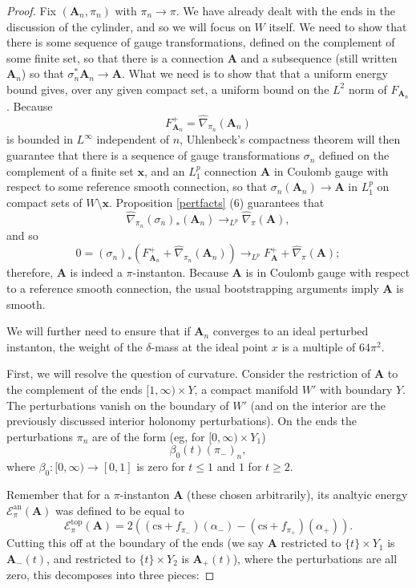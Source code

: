 \documentclass{memo-l}
\theoremstyle{definition}
\theoremstyle{remark}
\numberwithin{section}{chapter}
\numberwithin{equation}{chapter}
\begin{document}
\begin{proof}Fix $(\mathbf{A}_n, \pi_n)$ with $\pi_n \to \pi$. We have already dealt with the ends in the discussion of the cylinder, and so we will focus on $W$ itself. We need to show that there is some sequence of gauge transformations, defined on the complement of some finite set, so that there is a connection $\mathbf{A}$ and a subsequence (still written $\mathbf{A}_n$) so that $\sigma_n^*\mathbf{A}_n \to \mathbf{A}$. What we need is to show that that a uniform energy bound gives, over any given compact set, a uniform bound on the $L^2$ norm of $F_{\mathbf{A}_n}$. Because $$F^+_{\mathbf{A}_n} = \widehat{\nabla}_{\pi_n}(\mathbf{A}_n)$$ is bounded in $L^\infty$ independent of $n$, Uhlenbeck's compactness theorem will then guarantee that there is a sequence of gauge transformations $\sigma_n$ defined on the complement of a finite set $\mathbf{x}$, and an $L^p_1$ connection $\mathbf{A}$ in Coulomb gauge with respect to some reference smooth connection, so that $\sigma_n(\mathbf{A}_n) \to \mathbf{A}$ in $L^p_1$ on compact sets of $W \setminus \mathbf{x}$. Proposition \ref{pertfacts} (6) guarantees that 
$$\widehat{\nabla}_{\pi_n}(\sigma_n)_*(\mathbf{A}_n) \to_{L^p} \widehat{\nabla}_\pi(\mathbf{A}),$$ 
and so 
$$0 = (\sigma_n)_*\left(F^+_{\mathbf{A}_n} + \widehat{\nabla}_{\pi_n}(\mathbf{A}_n)\right) \to_{L^p} F^+_{\mathbf{A}} + \widehat{\nabla}_\pi(\mathbf{A});$$ 
therefore, $\mathbf{A}$ is indeed a $\pi$-instanton. Because $\mathbf{A}$ is in Coulomb gauge with respect to a reference smooth connection, the usual bootstrapping arguments imply $\mathbf{A}$ is smooth.

We will further need to ensure that if $\mathbf{A}_n$ converges to an ideal perturbed instanton, the weight of the $\delta$-mass at the ideal point $x$ is a multiple of $64\pi^2$.

First, we will resolve the question of curvature. Consider the restriction of $\mathbf{A}$ to the complement of the ends $[1,\infty) \times Y$, a compact manifold $W'$ with boundary $Y$. The perturbations vanish on the boundary of $W'$ (and on the interior are the previously discussed interior holonomy perturbations). On the ends the perturbations $\pi_n$ are of the form (eg, for $[0,\infty) \times Y_1$) $$\beta_0(t) (\pi_-)_n,$$ where $\beta_0: [0,\infty) \to [0,1]$ is zero for $t \leq 1$ and $1$ for $t \geq 2$.

Remember that for a $\pi$-instanton $\mathbf{A}$ (these chosen arbitrarily), its analtyic energy $\mathcal E^{\text{an}}_\pi(\mathbf{A})$ was defined to be equal to $$\mathcal E^{\text{top}}_\pi(\mathbf{A}) = 2\left((\text{cs}+f_{\pi_-})(\alpha_-) - (\text{cs}+f_{\pi_+})(\alpha_+)\right).$$ Cutting this off at the boundary of the ends (we say $\mathbf{A}$ restricted to $\{t\} \times Y_1$ is $\mathbf{A}_-(t)$, and restricted to $\{t\} \times Y_2$ is $\mathbf{A}_+(t)$), where the perturbations are all zero, this decomposes into three pieces:


\end{proof}
\end{document}
